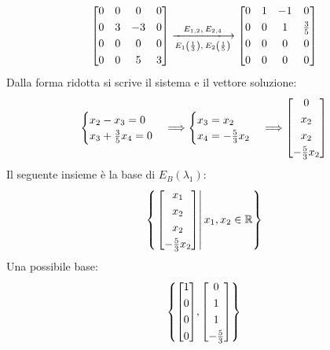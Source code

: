 \documentclass[a4paper]{article}
\makeatletter
\newenvironment{rowequmatbra}[1]{\left[\array{@{}#1@{}}}{\endarray\right]}
\makeatother
\begin{document}
	\begin{equation*}
		\begin{rowequmatbra}{cccc}
			0 & 0 & 0 & 0 	\\ [0.3em]
			0 & 3 & -3 & 0 	\\ [0.3em]
			0 & 0 & 0 & 0 	\\ [0.3em]
			0 & 0 & 5 & 3
		\end{rowequmatbra}
		\xlongrightarrow[E_{1}\left(\frac{1}{3}\right),\: E_{2}\left(\frac{1}{5}\right)]{E_{1,2},\: E_{2,4}}
		\begin{rowequmatbra}{cccc}
			0 & 1 & -1 & 0 	\\ [0.3em]
			0 & 0 & 1 & \frac{3}{5} \\ [0.3em]
			0 & 0 & 0 & 0 	\\ [0.3em]
			0 & 0 & 0 & 0
		\end{rowequmatbra}
	\end{equation*}
	Dalla forma ridotta si scrive il sistema e il vettore soluzione:
	\begin{equation*}
		\begin{cases}
			x_{2}-x_{3} = 0 \\
			x_{3} + \frac{3}{5}x_{4} = 0
		\end{cases} \Longrightarrow
		\begin{cases}
			x_{3} = x_{2} \\
			x_{4} = -\frac{5}{3}x_{2}
		\end{cases} \Longrightarrow
		\begin{rowequmatbra}{c}
			0 \\ [0.3em]
			x_{2} \\ [0.3em]
			x_{2} \\ [0.3em]
			-\frac{5}{3}x_{2}
		\end{rowequmatbra}
	\end{equation*}
	Il seguente insieme è la base di $E_{B}\left(\lambda_{1}\right)$:
	\begin{equation*}
		\left\{
		\left.
		\begin{rowequmatbra}{c}
			x_{1} \\ [0.3em]
			x_{2} \\ [0.3em]
			x_{2} \\ [0.3em]
			-\frac{5}{3}x_{2}
		\end{rowequmatbra}
		\right| x_{1}, x_{2} \in \mathbb{R}
		\right\}
	\end{equation*}
	Una possibile base:
	\begin{equation*}
		\left\{
		\begin{rowequmatbra}{c}
			1 \\ [0.3em]
			0 \\ [0.3em]
			0 \\ [0.3em]
			0
		\end{rowequmatbra}, \begin{rowequmatbra}{c}
			0 \\ [0.3em]
			1 \\ [0.3em]
			1 \\ [0.3em]
			-\frac{5}{3}
		\end{rowequmatbra}
		\right\}
	\end{equation*}
	\newpage
	
\end{document}
